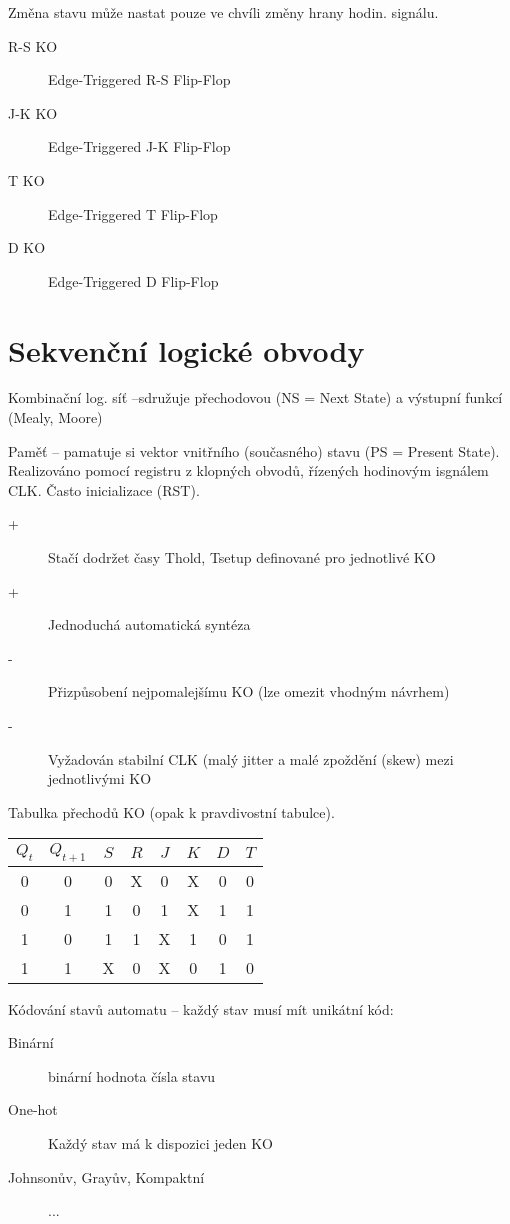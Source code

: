 \documentclass[a4paper, 11pt]{report}
\begin{document}
Změna stavu může nastat pouze ve chvíli změny hrany hodin. signálu.

\begin{description}
	\item[R-S KO] Edge-Triggered R-S Flip-Flop
	\item[J-K KO] Edge-Triggered J-K Flip-Flop
	\item[T KO] Edge-Triggered T Flip-Flop
	\item[D KO] Edge-Triggered D Flip-Flop
\end{description}


\section{Sekvenční logické obvody}
	
Kombinační log. síť --sdružuje přechodovou (NS = Next State) a výstupní funkcí (Mealy, Moore)

Paměť -- pamatuje si vektor vnitřního (současného) stavu (PS = Present State). Realizováno pomocí registru z klopných obvodů, řízených hodinovým isgnálem CLK. Často inicializace (RST).

\begin{description}
	\item[+] Stačí dodržet časy Thold, Tsetup definované pro jednotlivé KO
	\item[+] Jednoduchá automatická syntéza
	\item[-] Přizpůsobení nejpomalejšímu KO (lze omezit vhodným návrhem)
	\item[-] Vyžadován stabilní CLK (malý jitter a malé zpoždění (skew) mezi jednotlivými KO
\end{description}

Tabulka přechodů KO (opak k pravdivostní tabulce).

\begin{tabular}{| *{2}{c} | *{2}{c} | *{2}{c} | c | c |}
	\hline
	$Q_t$ & $Q_{t+1}$ & $S$ & $R$ & $J$ & $K$ & $D$ & $T$ \\ \hline
	0 & 0 & 0 & X & 0 & X & 0 & 0 \\
	0 & 1 & 1 & 0 & 1 & X & 1 & 1 \\
	1 & 0 & 1 & 1 & X & 1 & 0 & 1 \\
	1 & 1 & X & 0 & X & 0 & 1 & 0 \\
	\hline
\end{tabular}


Kódování stavů automatu -- každý stav musí mít unikátní kód:
\begin{description}
	\item[Binární] binární hodnota čísla stavu
	\item[One-hot] Každý stav má k dispozici jeden KO
	\item[Johnsonův, Grayův, Kompaktní] ...
\end{description}
\end{document}
